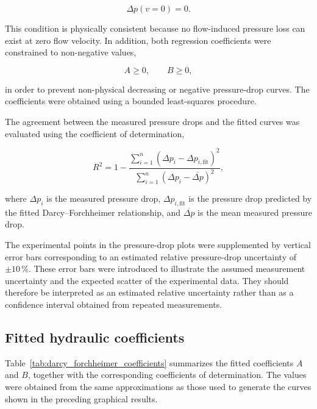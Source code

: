 \documentclass[a4paper]{article}
\begin{document}
\begin{equation}
    \Delta p(v=0)=0.
\end{equation}

This condition is physically consistent because no flow-induced pressure loss can exist at zero flow velocity. In addition, both regression coefficients were constrained to non-negative values,

\begin{equation}
    A \geq 0,
    \qquad
    B \geq 0,
\end{equation}

in order to prevent non-physical decreasing or negative pressure-drop curves. The coefficients were obtained using a bounded least-squares procedure.

The agreement between the measured pressure drops and the fitted curves was evaluated using the coefficient of determination,

\begin{equation}
    R^2
    =
    1-
    \frac{
        \sum_{i=1}^{n}
        \left(
            \Delta p_i-\Delta p_{i,\mathrm{fit}}
        \right)^2
    }{
        \sum_{i=1}^{n}
        \left(
            \Delta p_i-\overline{\Delta p}
        \right)^2
    },
    \label{eq:r_squared}
\end{equation}

where \(\Delta p_i\) is the measured pressure drop, \(\Delta p_{i,\mathrm{fit}}\) is the pressure drop predicted by the fitted Darcy--Forchheimer relationship, and \(\overline{\Delta p}\) is the mean measured pressure drop.

The experimental points in the pressure-drop plots were supplemented by vertical error bars corresponding to an estimated relative pressure-drop uncertainty of \(\pm 10\,\%\). These error bars were introduced to illustrate the assumed measurement uncertainty and the expected scatter of the experimental data. They should therefore be interpreted as an estimated relative uncertainty rather than as a confidence interval obtained from repeated measurements.

\subsection{Fitted hydraulic coefficients}
\label{subsec:fitted_hydraulic_coefficients}

Table~\ref{tab:darcy_forchheimer_coefficients} summarizes the fitted coefficients \(A\) and \(B\), together with the corresponding coefficients of determination. The values were obtained from the same approximations as those used to generate the curves shown in the preceding graphical results.
\end{document}
